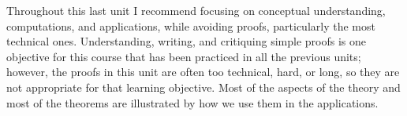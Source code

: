 \documentclass[11pt]{article}
\begin{document}
Throughout this last unit I recommend focusing on conceptual understanding, computations, and applications, while avoiding proofs, particularly the most technical ones.    Understanding, writing, and critiquing simple proofs is one objective for this course that has been practiced in all the previous units; however, the proofs in this unit are often too technical, hard, or long, so they are not appropriate for that learning objective.  Most of the aspects of the theory and most of the theorems are illustrated by how we use them in the applications.
\end{document}
